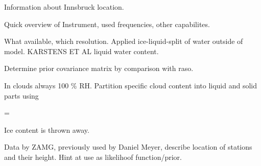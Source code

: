 Information about Innsbruck location.

\startsection[title=HATPRO]

    Quick overview of Instrument, used frequencies, other capabilites.

\stopsection

\startsection[title=Radiosonde Climatology]

    What available, which resolution. Applied ice-liquid-split of water outside
    of model. KARSTENS ET AL liquid water content.

\stopsection

\startsection[title=COSMO7 Simulated Radiosoundings]

    Determine prior covariance matrix by comparison with raso.

    In clouds always 100 \% RH. Partition specific cloud content into liquid
    and solid parts using

    \startformula
        \QLIQ = \QCLOUD \startcases
              \KELVIN \le \TEMP \NR
            \NC \frac{\TEMP - 233.15 \KELVIN}{40 \KELVIN}
                 \KELVIN \lt \TEMP {} \KELVIN \NR
              \KELVIN \le \TEMP \NR
        \stopcases
    \stopformula

    Ice content is thrown away.

\stopsection


\startsection[title={Nordkette Slope Measurements}]

    Data by ZAMG, previously used by Daniel Meyer, describe location of
    stations and their height. Hint at use as likelihoof function/prior.

\stopsection

